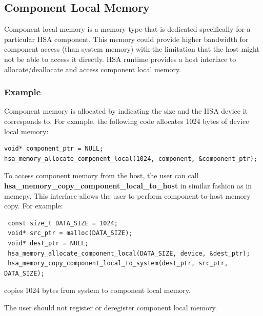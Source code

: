 \documentclass[final]{book}
\newcommand{\reffun}[1]{\textbf{#1}}
\begin{document}


\hypertarget{device-memory}{}\subsection{Component Local Memory}
\label{device-memory}

Component local memory is a memory type that is dedicated specifically for a
particular HSA component. This memory could provide higher bandwidth for
component access (than system memory) with the limitation that the host might
not be able to access it directly. HSA runtime provides a host interface to
allocate/deallocate and access component local memory.



\hypertarget{device-memory-usage}{}\subsubsection{Example}\label{device-memory-usage}

Component memory is allocated by indicating the size and the HSA device it
corresponds to. For example, the following code allocates 1024 bytes of device
local memory:

\begin{lstlisting}
void* component_ptr = NULL;
hsa_memory_allocate_component_local(1024, component, &component_ptr);
\end{lstlisting}

To access component memory from the host, the user can call
\reffun{hsa_memory_copy_component_local_to_host} in similar fashion as in
memcpy. This interface allows the user to perform component-to-host memory
copy. For example:

\begin{lstlisting}
 const size_t DATA_SIZE = 1024;
 void* src_ptr = malloc(DATA_SIZE);
 void* dest_ptr = NULL;
 hsa_memory_allocate_component_local(DATA_SIZE, device, &dest_ptr);
 hsa_memory_copy_component_local_to_system(dest_ptr, src_ptr, DATA_SIZE);
\end{lstlisting}

copies 1024 bytes from system to component local memory.

The user should not register or deregister component local memory.
\end{document}
